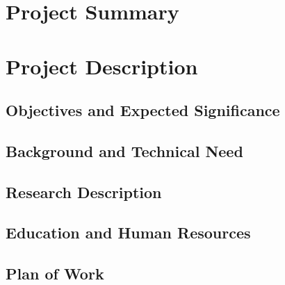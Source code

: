 \documentclass{article}
\begin{document}

\section{Project Summary} \label{s:summary}

\section{Project Description} \label{s:description}

\subsection{Objectives and Expected Significance}
\subsection{Background and Technical Need}
\subsection{Research Description}
\subsection{Education and Human Resources}
\subsection{Plan of Work}
\end{document}

